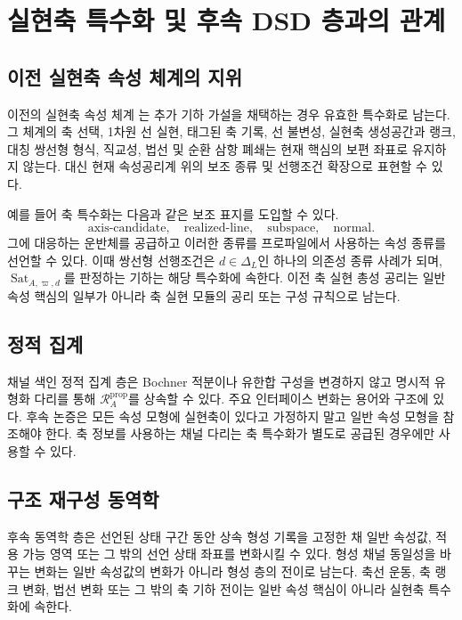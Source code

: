 \documentclass[11pt]{article}
\newcommand{\Dep}{\Delta_{L}}
\newcommand{\Sat}{\operatorname{Sat}}
\newcommand{\PropRec}{\mathcal R^{\mathrm{prop}}}
\theoremstyle{definition}
\theoremstyle{remark}
\begin{document}
\section{실현축 특수화 및 후속 DSD 층과의 관계}
\label{sec:specialization}

\subsection{이전 실현축 속성 체계의 지위}

이전의 실현축 속성 체계 \cite{KwonAxisProperty}는 추가 기하 가설을 채택하는 경우 유효한 특수화로 남는다.
그 체계의 축 선택, 1차원 선 실현, 태그된 축 기록, 선 불변성, 실현축 생성공간과 랭크, 대칭 쌍선형 형식, 직교성, 법선 및 순환 삼항 폐쇄는 현재 핵심의 보편 좌표로 유지하지 않는다.
대신 현재 속성공리계 위의 보조 종류 및 선행조건 확장으로 표현할 수 있다.

예를 들어 축 특수화는 다음과 같은 보조 표지를 도입할 수 있다.
\[
\mathrm{axis\mbox{-}candidate},\quad
\mathrm{realized\mbox{-}line},\quad
\mathrm{subspace},\quad
\mathrm{normal}.
\]
그에 대응하는 운반체를 공급하고 이러한 종류를 프로파일에서 사용하는 속성 종류를 선언할 수 있다.
이때 쌍선형 선행조건은 \(d\in\Dep\)인 하나의 의존성 종류 사례가 되며, \(\Sat_{A,\varpi,d}\)를 판정하는 기하는 해당 특수화에 속한다.
이전 축 실현 총성 공리는 일반 속성 핵심의 일부가 아니라 축 실현 모듈의 공리 또는 구성 규칙으로 남는다.

\subsection{정적 집계}

채널 색인 정적 집계 층은 Bochner 적분이나 유한합 구성을 변경하지 않고 명시적 유형화 다리를 통해 \(\PropRec_A\)를 상속할 수 있다.
주요 인터페이스 변화는 용어와 구조에 있다. 후속 논증은 모든 속성 모형에 실현축이 있다고 가정하지 말고 일반 속성 모형을 참조해야 한다.
축 정보를 사용하는 채널 다리는 축 특수화가 별도로 공급된 경우에만 사용할 수 있다.

\subsection{구조 재구성 동역학}

후속 동역학 층은 선언된 상태 구간 동안 상속 형성 기록을 고정한 채 일반 속성값, 적용 가능 영역 또는 그 밖의 선언 상태 좌표를 변화시킬 수 있다.
형성 채널 동일성을 바꾸는 변화는 일반 속성값의 변화가 아니라 형성 층의 전이로 남는다.
축선 운동, 축 랭크 변화, 법선 변화 또는 그 밖의 축 기하 전이는 일반 속성 핵심이 아니라 실현축 특수화에 속한다.
\end{document}
